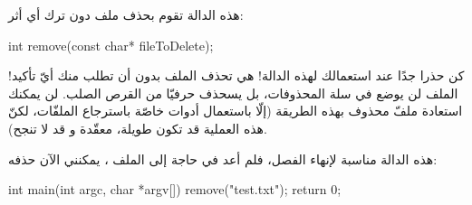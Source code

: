هذه الدالة تقوم بحذف ملف دون ترك أي أثر:

\begin{Csource}
int remove(const char* fileToDelete);
\end{Csource}

\begin{critical}
  كن حذرا جدًا عند استعمالك لهذه الدالة! هي تحذف الملف بدون أن تطلب منك أيّ تأكيد! الملف لن يوضع في سلة المحذوفات، بل يسحذف حرفيّا من القرص الصلب. لن يمكنك استعادة ملفّ محذوف بهذه الطريقة (إلّا باستعمال أدوات خاصّة باسترجاع الملفّات، لكنّ هذه العملية قد تكون طويلة، معقّدة و قد لا تنجح).
\end{critical}

هذه الدالة مناسبة لإنهاء الفصل، فلم أعد في حاجة إلى الملف
،
يمكنني الآن حذفه:

\begin{Csource}
int main(int argc, char *argv[])
{
    remove("test.txt");
    return 0;
}
\end{Csource}
